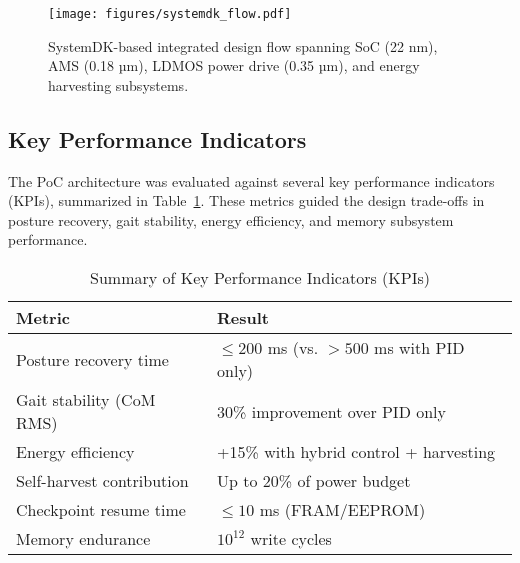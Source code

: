 \begin{figure}[t]
    \centering
    \texttt{[image: figures/systemdk\_flow.pdf]}
    \caption{SystemDK-based integrated design flow spanning SoC (22 nm), AMS (0.18 µm),
    LDMOS power drive (0.35 µm), and energy harvesting subsystems.}
    \label{fig:systemdk_flow}
\end{figure}

\subsection{Key Performance Indicators}
The PoC architecture was evaluated against several key performance indicators (KPIs),
summarized in Table~\ref{tab:kpi_summary}. These metrics guided the design trade-offs
in posture recovery, gait stability, energy efficiency, and memory subsystem performance.

\begin{table}[t]
\caption{Summary of Key Performance Indicators (KPIs)}
\label{tab:kpi_summary}
\centering
\renewcommand{\arraystretch}{1.2}
\begin{tabular}{p{3.5cm} p{3.5cm}}
\toprule
\textbf{Metric} & \textbf{Result} \\
\midrule
Posture recovery time & $\leq 200$ ms (vs. $>500$ ms with PID only) \\
Gait stability (CoM RMS) & 30\% improvement over PID only \\
Energy efficiency & +15\% with hybrid control + harvesting \\
Self-harvest contribution & Up to 20\% of power budget \\
Checkpoint resume time & $\leq 10$ ms (FRAM/EEPROM) \\
Memory endurance & $10^{12}$ write cycles \\
\bottomrule
\end{tabular}
\end{table}
